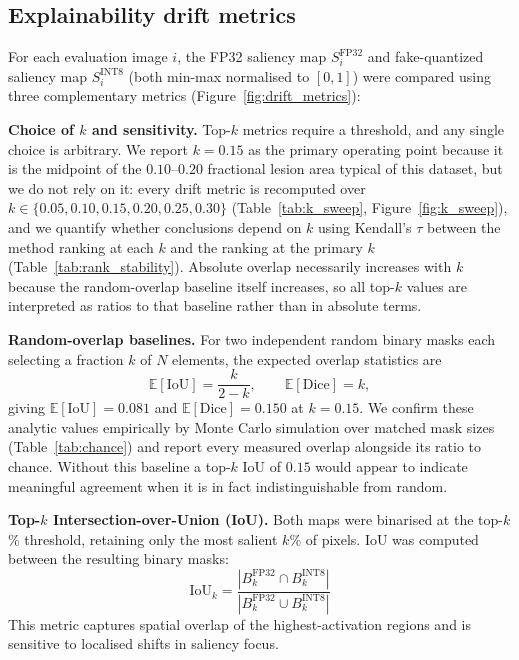 \documentclass[fleqn,10pt]{wlscirep}
\begin{document}
\subsection*{Explainability drift metrics}

For each evaluation image $i$, the FP32 saliency map $S_i^{\text{FP32}}$ and fake-quantized saliency map $S_i^{\text{INT8}}$ (both min-max normalised to $[0,1]$) were compared using three complementary metrics (Figure~\ref{fig:drift_metrics}):

\textbf{Choice of $k$ and sensitivity.} Top-$k$ metrics require a threshold, and any single choice is arbitrary. We report $k = 0.15$ as the primary operating point because it is the midpoint of the $0.10$--$0.20$ fractional lesion area typical of this dataset, but we do not rely on it: every drift metric is recomputed over $k \in \{0.05, 0.10, 0.15, 0.20, 0.25, 0.30\}$ (Table~\ref{tab:k_sweep}, Figure~\ref{fig:k_sweep}), and we quantify whether conclusions depend on $k$ using Kendall's $\tau$ between the method ranking at each $k$ and the ranking at the primary $k$ (Table~\ref{tab:rank_stability}). Absolute overlap necessarily increases with $k$ because the random-overlap baseline itself increases, so all top-$k$ values are interpreted as ratios to that baseline rather than in absolute terms.

\textbf{Random-overlap baselines.} For two independent random binary masks each selecting a fraction $k$ of $N$ elements, the expected overlap statistics are
\begin{equation}
\mathbb{E}[\text{IoU}] = \frac{k}{2-k}, \qquad \mathbb{E}[\text{Dice}] = k,
\label{eq:chance}
\end{equation}
giving $\mathbb{E}[\text{IoU}] = 0.081$ and $\mathbb{E}[\text{Dice}] = 0.150$ at $k = 0.15$. We confirm these analytic values empirically by Monte Carlo simulation over matched mask sizes (Table~\ref{tab:chance}) and report every measured overlap alongside its ratio to chance. Without this baseline a top-$k$ IoU of $0.15$ would appear to indicate meaningful agreement when it is in fact indistinguishable from random.

\textbf{Top-$k$ Intersection-over-Union (IoU).} Both maps were binarised at the top-$k$\% threshold, retaining only the most salient $k$\% of pixels. IoU was computed between the resulting binary masks:
\begin{equation}
\text{IoU}_k = \frac{|B_k^{\text{FP32}} \cap B_k^{\text{INT8}}|}{|B_k^{\text{FP32}} \cup B_k^{\text{INT8}}|}
\label{eq:iou}
\end{equation}
This metric captures spatial overlap of the highest-activation regions and is sensitive to localised shifts in saliency focus.
\end{document}
